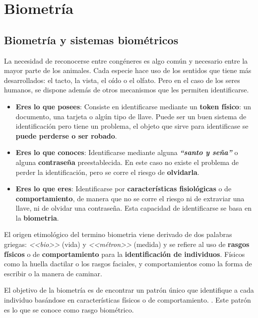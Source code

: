 \chapter{Biometría}\label{apendix:Biometria}

\section{Biometría y sistemas biométricos}\label{sec:Biometria}

La necesidad de reconocerse entre congéneres es algo común y necesario entre la mayor parte de los animales. Cada especie hace uso de los sentidos que tiene más desarrollados: el tacto, la vista, el oído o el olfato. Pero en el caso de los seres humanos, se dispone además de otros mecanismos que les permiten identificarse.

\begin{itemize}
    \item
    \textbf{Eres lo que posees}: Consiste en identificarse mediante un \textbf{token físico}: un documento, una tarjeta o algún tipo de llave. Puede ser un buen sistema de identificación pero tiene un problema, el objeto que sirve para identificase se \textbf{puede perderse o ser robado}.
    \item
    \textbf{Eres lo que conoces}: Identificarse mediante alguna \textbf{\textit{``santo y seña''}} o alguna \textbf{contraseña} preestablecida. En este caso no existe el problema de perder la identificación, pero se corre el riesgo de \textbf{olvidarla}. 
    \item
    \textbf{Eres lo que eres}: Identificarse por \textbf{características fisiológicas} o de \textbf{comportamiento}, de manera que no se corre el riesgo ni de extraviar una llave, ni de olvidar una contraseña. Esta capacidad de identificarse se basa en la \textbf{\gls{biometria}}.
\end{itemize}

El origen etimológico del termino \gls{biometria} viene derivado de dos palabras griegas: \textit{<<bio>>} (vida) y \textit{<<métron>>} (medida) y se refiere al uso de \textbf{rasgos físicos} o de \textbf{comportamiento} para la \textbf{identificación de individuos}. Físicos como la huella dactilar o los rasgos faciales, y comportamientos como la forma de escribir o la manera de caminar.

El objetivo de la biometría es de encontrar un patrón único que identifique a cada individuo basándose en características físicos o de comportamiento. \cite{li2009encyclopedia}. Este patrón es lo que se conoce como rasgo biométrico.

